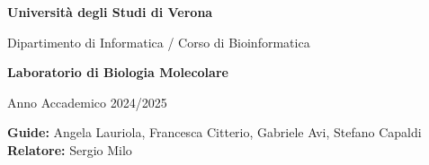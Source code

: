     \vspace*{2cm}
    
    {\Large\bfseries Università degli Studi di Verona \par}
    \vspace{0.5cm}
    {\large Dipartimento di Informatica / Corso di Bioinformatica \par}
    
    \vspace{3cm}
    
    {\Huge\bfseries Laboratorio di Biologia Molecolare\par}
    \vspace{0.5cm}
    {\LARGE Anno Accademico 2024/2025\par}
    
    \vfill
    
    \begin{flushleft}
    \textbf{Guide:} Angela Lauriola, Francesca Citterio, Gabriele Avi, Stefano Capaldi \\
    \textbf{Relatore:} Sergio Milo \\
    \end{flushleft}
    
    \vspace{2cm}
    
    \begin{flushleft}
    \end{flushleft}
    \newpage
